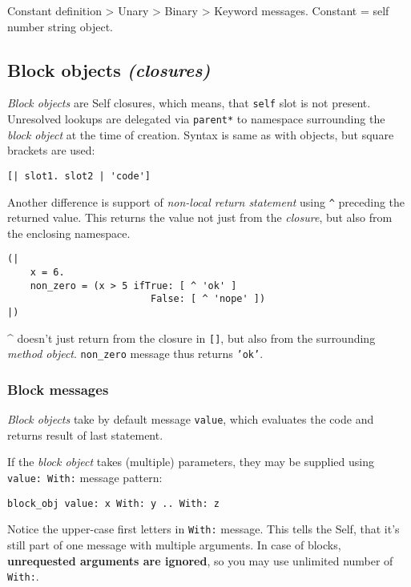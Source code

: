 \documentclass[10pt]{article}
\begin{document}
\begin{multicols*}{3}
Constant definition \textgreater{} Unary \textgreater{} Binary \textgreater{} Keyword messages. Constant = self \textbar{} number \textbar{} string \textbar{} object.




\subsection{Block objects \textit{(closures)}}

\textit{Block objects} are Self closures, which means, that \texttt{self} slot is not present. Unresolved lookups are delegated via \texttt{parent*} to namespace surrounding the \textit{block object} at the time of creation. Syntax is same as with objects, but square brackets are used:

\begin{lstlisting}
[| slot1. slot2 | 'code']
\end{lstlisting}


Another difference is support of \textit{non-local return statement} using \texttt{\^} preceding the returned value. This returns the value not just from the \textit{closure}, but also from the enclosing namespace.

\begin{lstlisting}
(|
    x = 6.
    non_zero = (x > 5 ifTrue: [ ^ 'ok' ]
                         False: [ ^ 'nope' ])
|)
\end{lstlisting}

\^{} doesn't just return from the closure in \texttt{[]}, but also from the surrounding \textit{method object}. \texttt{non\_zero} message thus returns \texttt{'ok'}.



\subsubsection{Block messages}

\textit{Block objects} take by default message \texttt{value}, which evaluates the code and returns result of last statement.

If the \textit{block object} takes (multiple) parameters, they may be supplied using \texttt{value:\ With:} message pattern:

\begin{lstlisting}
block_obj value: x With: y .. With: z
\end{lstlisting}

Notice the upper-case first letters in \texttt{With:} message. This tells the Self, that it's still part of one message with multiple arguments. In case of blocks, \textbf{unrequested arguments are ignored}, so you may use unlimited number of \texttt{With:}.





\end{multicols*}
\end{document}
